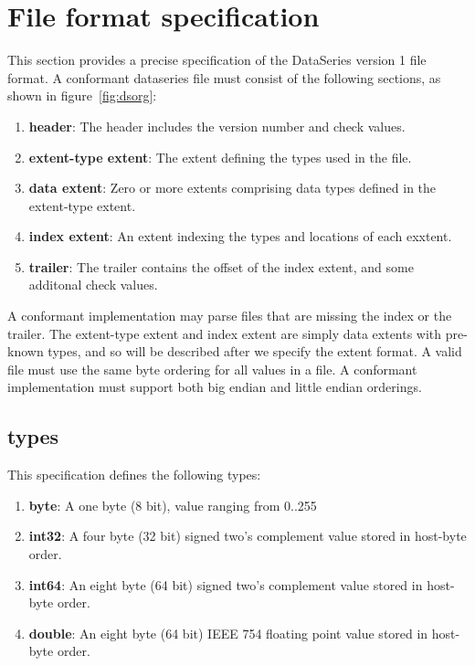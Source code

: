 \section{File format specification}

This section provides a precise specification of the DataSeries
version 1 file format.  A conformant dataseries file must consist of
the following sections, as shown in figure~\ref{fig:dsorg}:

\begin{enumerate}
\item {\bf header}: The header includes the version number and check values.
\item {\bf extent-type extent}: The extent defining the types used in the file.
\item {\bf data extent}: Zero or more extents comprising data types defined in the extent-type extent.
\item {\bf index extent}: An extent indexing the types and locations of each exxtent.
\item {\bf trailer}: The trailer contains the offset of the index extent, and some additonal check values.
\end{enumerate}

A conformant implementation may parse files that are missing the index
or the trailer.  The extent-type extent and index extent are simply
data extents with pre-known types, and so will be described after we
specify the extent format.  A valid file must use the same byte
ordering for all values in a file.  A conformant implementation must
support both big endian and little endian orderings.

\subsection{types}

This specification defines the following types:

\begin{enumerate}
\item {\bf byte}: A one byte (8 bit), value ranging from 0..255
\item {\bf int32}: A four byte (32 bit) signed two's complement value stored in host-byte order.
\item {\bf int64}: An eight byte (64 bit) signed two's complement value stored in host-byte order.
\item {\bf double}: An eight byte (64 bit) IEEE 754 floating point value stored in host-byte order.
\end{enumerate}

